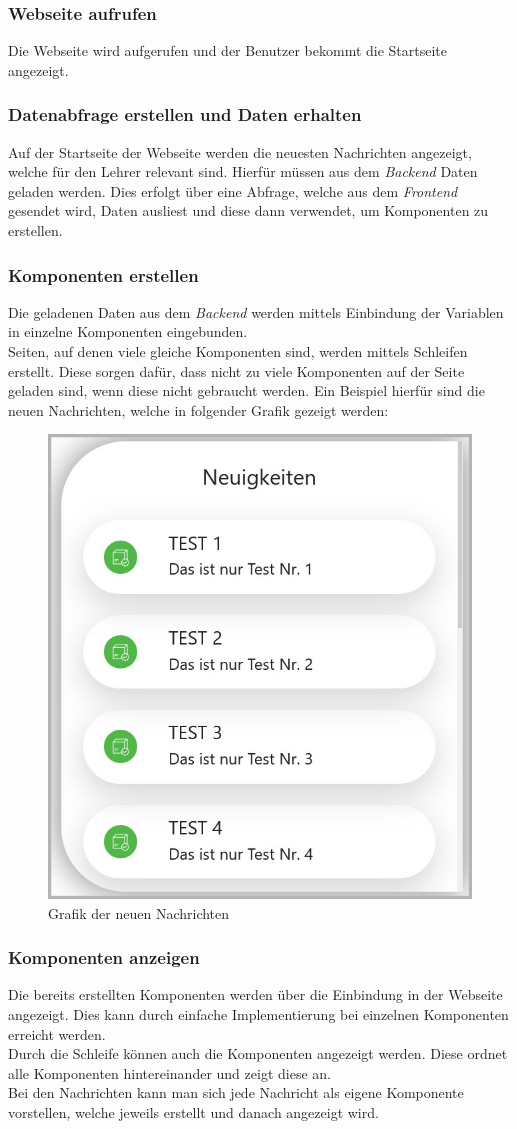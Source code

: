 \subsubsection{Webseite aufrufen}
Die Webseite wird aufgerufen und der Benutzer bekommt die Startseite angezeigt.

\subsubsection{Datenabfrage erstellen und Daten erhalten}
Auf der Startseite der Webseite werden die neuesten Nachrichten angezeigt, welche für den Lehrer relevant sind. Hierfür müssen aus dem \textit{Backend} Daten geladen werden. Dies erfolgt über eine Abfrage, welche aus dem \textit{Frontend} gesendet wird, Daten ausliest und diese dann verwendet, um Komponenten zu erstellen.

\subsubsection{Komponenten erstellen}
Die geladenen Daten aus dem \textit{Backend} werden mittels Einbindung der Variablen in einzelne Komponenten eingebunden.\\
Seiten, auf denen viele gleiche Komponenten sind, werden mittels Schleifen erstellt. Diese sorgen dafür, dass nicht zu viele Komponenten auf der Seite geladen sind, wenn diese nicht gebraucht werden.
Ein Beispiel hierfür sind die neuen Nachrichten, welche in folgender Grafik gezeigt werden:
\begin{figure}[H]
	\centering
	\includegraphics[width=0.3\linewidth]{images/rfoster_konzept/messages_index}
	\caption[Neue Nachrichten]{Grafik der neuen Nachrichten}
	\label{fig:messagesindex}
\end{figure}

\subsubsection{Komponenten anzeigen}
Die bereits erstellten Komponenten werden über die Einbindung in der Webseite angezeigt. Dies kann durch einfache Implementierung bei einzelnen Komponenten erreicht werden.\\
Durch die Schleife können auch die Komponenten angezeigt werden. Diese ordnet alle Komponenten hintereinander  und zeigt diese an.\\
Bei den Nachrichten kann man sich jede Nachricht als eigene Komponente vorstellen, welche jeweils erstellt und danach angezeigt wird.
